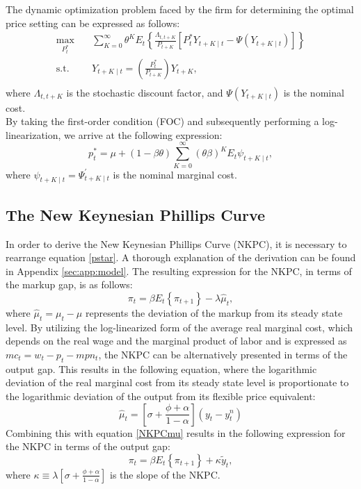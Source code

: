 \documentclass[11pt, a4paper, leqno]{article}
\begin{document}
The dynamic optimization problem faced by the firm for determining the optimal price setting can be expressed as follows:
\begin{equation}
	\begin{aligned}
	\max_{P^{*}_{t}}  \quad & \sum_{K=0}^{\infty} \theta^{K} E_{t} \left\{ \frac{\Lambda_{t,t+K}}{P_{t+K}} \left[ P_{t}^{*} Y_{t+K \mid t} - \Psi \left( Y_{t+K \mid t} \right) \right] \right\} \\
	\textrm{s.t.} \quad & Y_{t+K \mid t} = \left( \frac{P^{*}_{t}}{P_{t+K}} \right) Y_{t+K}, \\
	\end{aligned}
\end{equation}
where $\Lambda_{t,t+K}$ is the stochastic discount factor, and $\Psi \left( Y_{t+K \mid t} \right)$ is the nominal cost.\\
By taking the first-order condition (FOC) and subsequently performing a log-linearization, we arrive at the following expression:
\begin{equation} \label{pstar}
	p^{*}_{t} = \mu + \left(1-\beta \theta \right) \sum_{K=0}^{\infty} \left(\theta \beta \right)^{K} E_{t} \psi_{t+K \mid t},
\end{equation}
where $\psi_{t+K \mid t}=\Psi^{'}_{t+K \mid t}$ is the nominal marginal cost.
\subsection{The New Keynesian Phillips Curve}
In order to derive the New Keynesian Phillips Curve (NKPC), it is necessary to rearrange equation \ref{pstar}. A thorough explanation of the derivation can be found in Appendix \ref{sec:app:model}. The resulting expression for the NKPC, in terms of the markup gap, is as follows:
\begin{equation} \label{NKPCmu}
	\pi_{t} = \beta E_{t} \left\{ \pi_{t+1} \right\} - \lambda \hat{\mu}_{t},
\end{equation}
where $\hat{\mu}_{t}= \mu_{t}-\mu$ represents the deviation of the markup from its steady state level. By utilizing the log-linearized form of the average real marginal cost, which depends on the real wage and the marginal product of labor and is expressed as $mc_{t} = w_{t} - p_{t} - mpn_{t} $, the NKPC can be alternatively presented in terms of the output gap. This results in the following equation, where the logarithmic deviation of the real marginal cost from its steady state level is proportionate to the logarithmic deviation of the output from its flexible price equivalent:
\begin{equation}
	\hat{\mu}_{t}= \left[ \sigma + \frac{\phi + \alpha}{1- \alpha} \right] \left( y_{t} - y_{t}^{n} \right)
\end{equation}
Combining this with equation \ref{NKPCmu} results in the following expression for the NKPC in terms of the output gap:
\begin{equation}  \label{NKPCygap}
	\pi_{t} = \beta E_{t} \left\{ \pi_{t+1} \right\} + \kappa \widetilde{y}_{t},
\end{equation}
where $\kappa \equiv \lambda \left[ \sigma + \frac{\phi + \alpha}{1- \alpha} \right] $ is the slope of the NKPC.
\end{document}
